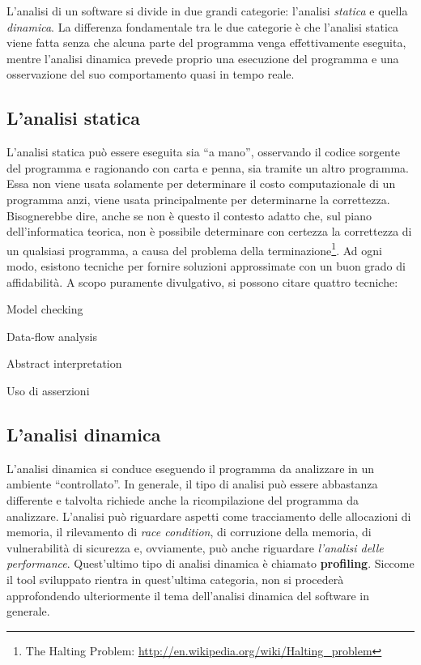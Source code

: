 \documentclass[a4paper,11pt]{report}
\begin{document}
L'analisi di un software si divide in due grandi categorie: l'analisi \textit{statica} e quella \textit{dinamica}.
La differenza fondamentale tra le due categorie è che l'analisi statica viene fatta senza che alcuna parte del programma venga effettivamente eseguita, mentre l'analisi dinamica prevede proprio una esecuzione del programma e una osservazione del suo comportamento quasi in tempo reale. 

\subsection{L'analisi statica}
L'analisi statica può essere eseguita sia ``a mano'', osservando il codice sorgente del programma e ragionando con carta e penna, sia tramite un altro programma. Essa non viene usata solamente per determinare il costo computazionale di un programma anzi, viene usata principalmente per determinarne la correttezza. Bisognerebbe dire, anche se non è questo il contesto adatto che, sul piano dell'informatica teorica, non è possibile determinare con certezza la correttezza di un qualsiasi programma, a causa del problema della terminazione\footnote{The Halting Problem: \url{http://en.wikipedia.org/wiki/Halting_problem}}. Ad ogni modo, esistono tecniche per fornire soluzioni approssimate con un buon grado di affidabilità. A scopo puramente divulgativo, si possono citare quattro tecniche:

\begin{itemize*}
\item Model checking
\item Data-flow analysis
\item Abstract interpretation
\item Uso di asserzioni
\end{itemize*}

\subsection{L'analisi dinamica}
L'analisi dinamica si conduce eseguendo il programma da analizzare in un ambiente ``controllato''. In generale, il tipo di analisi può essere abbastanza differente e talvolta richiede anche la ricompilazione del programma da analizzare. L'analisi può riguardare aspetti come tracciamento delle allocazioni di memoria, il rilevamento di \textit{race condition}, di corruzione della memoria, di vulnerabilità di sicurezza e, ovviamente, può anche riguardare \textit{l'analisi delle performance}. Quest'ultimo tipo di analisi dinamica è chiamato \textbf{profiling}. Siccome il tool sviluppato rientra in quest'ultima categoria, non si procederà approfondendo ulteriormente il tema dell'analisi dinamica del software in generale.
\end{document}
